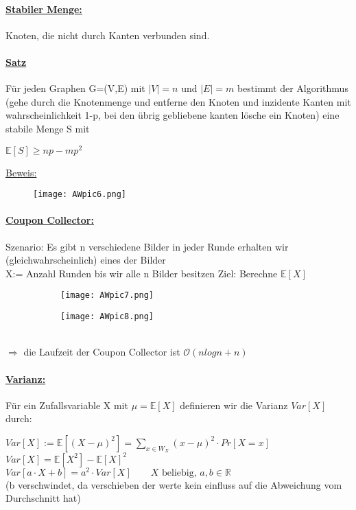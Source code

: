 \documentclass[8pt]{extreport}
\begin{document}
\paragraph{\underline{Stabiler Menge:}} Knoten, die nicht durch Kanten verbunden sind.
\paragraph{\underline{Satz}} Für jeden Graphen G=(V,E) mit $|V| = n$ und $|E| = m$ bestimmt der Algorithmus (gehe durch die Knotenmenge und entferne den Knoten und inzidente Kanten mit wahrscheinlichkeit 1-p, bei den übrig gebliebene kanten lösche ein Knoten) eine stabile Menge S mit
\begin{center}
$\mathbb{E}[S] \geq np - mp^2$
\end{center}\newpage
\underline{Beweis:}
\begin{figure}[h!]
	\centering\texttt{[image: AWpic6.png]}
	\caption{}
	\label{beispiel6}
\end{figure}

\paragraph{\underline{Coupon Collector:}\\}
Szenario: Es gibt n verschiedene Bilder in jeder Runde erhalten wir (gleichwahrscheinlich) eines der Bilder\\
X:= Anzahl Runden bis wir alle n Bilder besitzen
Ziel: Berechne $\mathbb{E}[X]$
\begin{figure}[h!]
	\centering
	\begin{subfigure}[b]{0.49\linewidth}
	\texttt{[image: AWpic7.png]}
	\caption{}
	\label{ziehungsmoglichkeiten}
	\end{subfigure}
	\begin{subfigure}[b]{0.49\linewidth}
	\texttt{[image: AWpic8.png]}
	\caption{}
	\label{ziehungsmoglichkeiten}
	\end{subfigure}
\end{figure}\\
$\Rightarrow$ die Laufzeit der Coupon Collector ist $\mathcal{O}(nlogn + n)$
\paragraph{\underline{Varianz:}} Für ein Zufallsvariable X mit $\mu = \mathbb{E}[X]$ definieren wir die Varianz $Var[X]$ durch:
\begin{center}
$Var[X] := \mathbb{E}[(X -\mu)^2] = \displaystyle\sum_{x \in W_X}(x -\mu)^2 \cdot Pr[X = x]$\\
$Var[X] = \mathbb{E}[X^2] - \mathbb{E}[X]^2$\\
$Var[a \cdot X + b] = a^2 \cdot Var[X] \qquad X \text{ beliebig, } a,b \in \mathbb{R}$\\
(b verschwindet, da verschieben der werte kein einfluss auf die Abweichung vom Durchschnitt hat)
\end{center}
\end{document}
